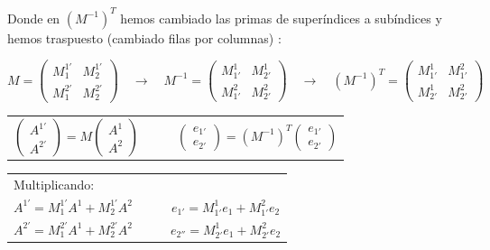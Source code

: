 Donde en ${(M^{-1})}^T$ hemos cambiado las primas de superíndices a subíndices y hemos traspuesto (cambiado filas por columnas)	:

$$	
M=\left( \begin{matrix}
 M^{1'}_{1} & M^{1'}_{2} \\ M^{2'}_{1} & M^{2'}_{2}	
 \end{matrix} \right) \quad \to \quad
 M^{-1}=\left( \begin{matrix}
 M^{1}_{1'} & M^{1}_{2'} \\ M^{2}_{1'} & M^{2}_{2'}	
 \end{matrix} \right) \quad \to \quad
 {(M^{-1})}^T=
 \left( \begin{matrix} M^{1}_{1'} & M^{2}_{1'} \\ M^{1}_{2'} & M^{2}_{2'}	\end{matrix} \right) $$
 
\begin{table}[H]
\centering
\begin{tabular}{ccc}
$\left( \begin{matrix} A^{1'} \\ A^{2'} \end{matrix} \right)= M \left( \begin{matrix} A^{1} \\ A^{2} \end{matrix} \right)$ & $\quad$ & $\left( \begin{matrix} e_{1'} \\ e_{2'} \end{matrix} \right)= {(M^{-1})}^T \left( \begin{matrix} e_{1'} \\ e_{2'} \end{matrix} \right)$  
\end{tabular}
\end{table}


\begin{table}[H]
\centering
\begin{tabular}{ccc}
 \multicolumn{3}{l}{Multiplicando:}     \\ 
$A^{1'}=M^{1'}_{1}A^1+M^{1'}_{2}A^2$                                                                                     & $\quad$ & $e_{1'}=M^{1}_{1'}e_1+M^{2}_{1'}e_2$                                                                                                  \\
$A^{2'}=M^{2'}_{1}A^1+M^{2'}_{2}A^2$                                                                                     & $\quad$ & $e_{2''}=M^{1}_{2'}e_1+M^{2}_{2'}e_2$ \\                                                                                        
\end{tabular}
\end{table}                                                                                   

